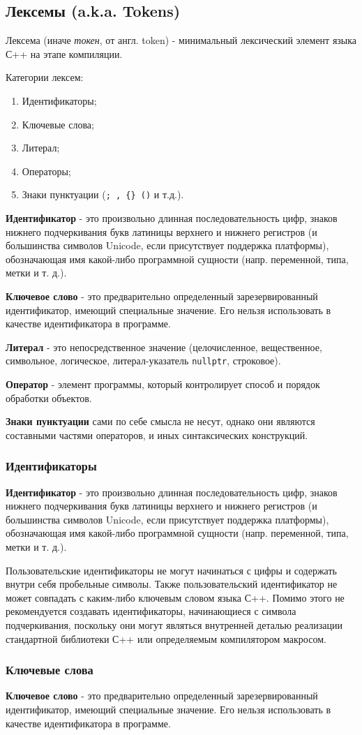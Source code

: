 \subsection{Лексемы (a.k.a. Tokens)}

Лексема (иначе \emph{токен}, от англ. token) - минимальный лексический
элемент языка С++ на этапе компиляции.

Категории лексем:
\begin{enumerate}
  \item Идентификаторы;
  \item Ключевые слова;
  \item Литерал;
  \item Операторы;
  \item Знаки пунктуации (\texttt{;\ ,\ \{\}\ ()} и т.д.).
\end{enumerate}

\textbf{Идентификатор} - это произвольно длинная последовательность
цифр, знаков нижнего подчеркивания букв латиницы верхнего и нижнего
регистров (и большинства символов Unicode, если присутствует поддержка
платформы), обозначающая имя какой-либо программной сущности (напр.
переменной, типа, метки и т. д.).

\textbf{Ключевое слово} - это предварительно определенный
зарезервированный идентификатор, имеющий специальные значение. Его
нельзя использовать в качестве идентификатора в программе.

\textbf{Литерал} - это непосредственное значение (целочисленное,
вещественное, символьное, логическое, литерал-указатель
\texttt{nullptr}, строковое).

\textbf{Оператор} - элемент программы, который контролирует способ и
порядок обработки объектов.

\textbf{Знаки пунктуации} сами по себе смысла не несут, однако они
являются составными частями операторов, и иных синтаксических
конструкций.

\subsubsection{Идентификаторы}

\textbf{Идентификатор} - это произвольно длинная последовательность
цифр, знаков нижнего подчеркивания букв латиницы верхнего и нижнего
регистров (и большинства символов Unicode, если присутствует поддержка
платформы), обозначающая имя какой-либо программной сущности (напр.
переменной, типа, метки и т. д.).

Пользовательские идентификаторы не могут начинаться с цифры и содержать
внутри себя пробельные символы. Также пользовательский идентификатор не
может совпадать с каким-либо ключевым словом языка С++. Помимо этого не
рекомендуется создавать идентификаторы, начинающиеся с символа
подчеркивания, поскольку они могут являться внутренней деталью
реализации стандартной библиотеки С++ или определяемым компилятором
макросом.

\subsubsection{Ключевые слова}

\textbf{Ключевое слово} - это предварительно определенный
зарезервированный идентификатор, имеющий специальные значение. Его
нельзя использовать в качестве идентификатора в программе.
